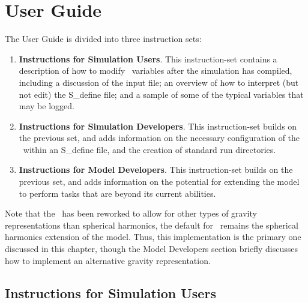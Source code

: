 \chapter{User Guide}\label{ch:user}
The User Guide is divided into three instruction sets:
\begin{enumerate}
 \item \textbf{Instructions for Simulation Users}.  This instruction-set
 contains a description of how to modify \ModelDesc\ variables after the
 simulation has compiled, including a discussion of the input file;
 an overview of how to interpret (but not edit) the S\_define file; and a
 sample of some of the typical variables that may be logged.
 \item \textbf{Instructions for Simulation Developers}.  This instruction-set
 builds on the previous set, and adds information on the necessary
 configuration of the \ModelDesc\ within an S\_define file, and the creation of
 standard run directories.
 \item \textbf{Instructions for Model Developers}.   This instruction-set
 builds on the previous set, and adds information on the potential for
 extending the model to perform tasks that are beyond its current abilities.
\end{enumerate}

Note that the \ModelDesc\ has been reworked to allow for
other types of gravity representations than spherical harmonics, the
default for \JEODid\ remains the spherical harmonics extension of the model.
Thus, this implementation is the primary one discussed in this chapter, though
the Model Developers section briefly discusses how to implement an alternative
gravity representation.

\section{Instructions for Simulation Users}

